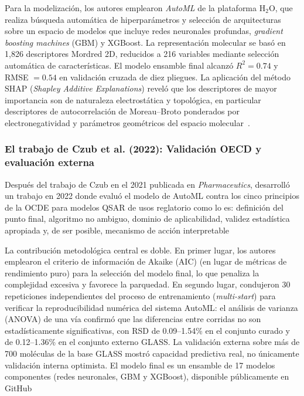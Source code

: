 Para la modelización, los autores emplearon \emph{AutoML} de la plataforma H$_2$O, que realiza búsqueda automática de hiperparámetros y selección de arquitecturas sobre un espacio de modelos que incluye redes neuronales profundas, \textit{gradient boosting machines} (GBM) y XGBoost. La representación molecular se basó en 1{,}826 descriptores Mordred 2D, reducidos a 216 variables mediante selección automática de características. El modelo ensamble final alcanzó $R^2 = 0.74$ y RMSE $= 0.54$ en validación cruzada de diez pliegues. La aplicación del método SHAP (\textit{Shapley Additive Explanations}) reveló que los descriptores de mayor importancia son de naturaleza electrostática y topológica, en particular descriptores de autocorrelación de Moreau--Broto ponderados por electronegatividad y parámetros geométricos del espacio molecular~\cite{czub_curated_2021}.


\subsubsection{El trabajo de Czub et al. (2022): Validación OECD y evaluación externa}

Después del trabajo de Czub en el 2021 publicada en \textit{Pharmaceutics}, desarrolló un trabajo en 2022 donde evaluó el modelo de AutoML contra los cinco principios de la OCDE para modelos QSAR de usos reglatorio como lo es: definición del punto final, algoritmo no ambiguo, dominio de aplicabilidad, validez estadística apropiada y, de ser posible, mecanismo de acción interpretable ~\cite{czub_automlbased_2022}

La contribución metodológica central es doble. En primer lugar, los autores emplearon el criterio de información de Akaike (AIC) (en lugar de métricas de rendimiento puro) para la selección del modelo final, lo que penaliza la complejidad excesiva y favorece la parquedad. En segundo lugar, condujeron 30 repeticiones independientes del proceso de entrenamiento (\textit{multi-start}) para verificar la reproducibilidad numérica del sistema AutoML: el análisis de varianza (ANOVA) de una vía confirmó que las diferencias entre corridas no son estadísticamente significativas, con RSD de 0.09–1.54\% en el conjunto curado y de 0.12–1.36\% en el conjunto externo GLASS. La validación externa sobre más de 700 moléculas de la base GLASS mostró capacidad predictiva real, no únicamente validación interna optimista. El modelo final es un ensamble de 17 modelos componentes (redes neuronales, GBM y XGBoost), disponible públicamente en GitHub ~\cite{czub_automlbased_2022}

